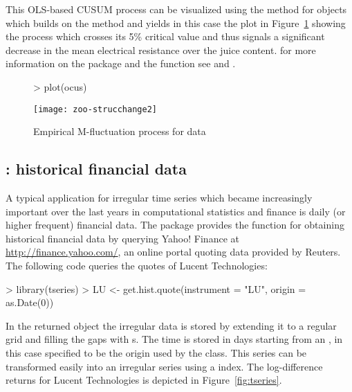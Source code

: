 \documentclass{Z}
\begin{document}
This OLS-based CUSUM process can be visualized using the  method
for  objects which builds on the  method and yields in
this case the plot in Figure~\ref{fig:strucchange} showing the process which
crosses its 5\% critical value and 
thus signals a significant decrease in the mean electrical resistance over the
juice content. for more information on the package  and the 
function  see \cite{zoo:Zeileis+Leisch+Hornik:2002} and 
\cite{zoo:Zeileis:2004}.

\begin{figure}
\begin{center}
\begin{Schunk}
\begin{Sinput}
> plot(ocus)
\end{Sinput}
\end{Schunk}
\texttt{[image: zoo-strucchange2]}
\caption{\label{fig:strucchange} Empirical M-fluctuation process for  data}
\end{center}
\end{figure}


\subsection[tseries: historical financial data]{: historical financial data}

A typical application for irregular time series which became increasingly
important over the last years in computational statistics and finance is
daily (or higher frequent) financial data. The package  provides
the function  for obtaining historical financial data
by querying Yahoo! Finance at \url{http://finance.yahoo.com/},
an online portal quoting data provided by Reuters. The following code
queries the quotes of Lucent Technologies:

\begin{Schunk}
\begin{Sinput}
> library(tseries)
> LU <- get.hist.quote(instrument = "LU", origin = as.Date(0))
\end{Sinput}
\end{Schunk}


In the returned  object the irregular data is stored by extending
it to a regular grid and filling the gaps with s. The time is stored
in days starting from an , in this case specified to be the
origin used by the  class.
This series can be transformed easily into an irregular  series 
using a  index. The log-difference returns for Lucent 
Technologies is depicted in Figure~\ref{fig:tseries}.
\end{document}
